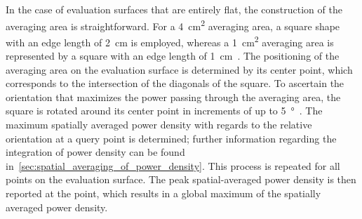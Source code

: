 In the case of evaluation surfaces that are entirely flat, the construction of the averaging area is straightforward.
For a \SI{4}{\cm\squared} averaging area, a square shape with an edge length of \SI{2}{\cm} is employed, whereas a \SI{1}{\cm\squared} averaging area is represented by a square with an edge length of \SI{1}{\cm}~\cite{IEEE2021Guide}.
The positioning of the averaging area on the evaluation surface is determined by its center point, which corresponds to the intersection of the diagonals of the square.
To ascertain the orientation that maximizes the power passing through the averaging area, the square is rotated around its center point in increments of up to \SI{5}{\degree}~\cite{IEC63195-2-2022}.
The maximum spatially averaged power density with regards to the relative orientation at a query point is determined; further information regarding the integration of power density can be found in~\cref{sec:spatial_averaging_of_power_density}.
This process is repeated for all points on the evaluation surface.
The peak spatial-averaged power density is then reported at the point, which results in a global maximum of the spatially averaged power density.

